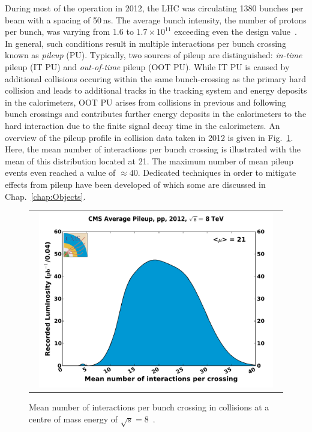 During most of the operation in 2012, the LHC was circulating 1380 bunches per beam with a spacing of 50\,ns. The average bunch intensity, \ie the number of protons per bunch, was varying from $1.6$ to $1.7 \times 10^{11}$ exceeding even the design value~\cite{bib:lhc:lumi12, Lamont:2013cma}. \\
In general, such conditions result in multiple interactions per bunch crossing known as \textit{pileup} (PU). Typically, two sources of pileup are distinguished: \textit{in-time} pileup (IT PU) and \textit{out-of-time} pileup (OOT PU). While IT PU is caused by additional \pp collisions occuring within the same bunch-crossing as the primary hard collision and leads to additional tracks in the tracking system and energy deposits in the calorimeters, OOT PU arises from \pp collisions in previous and following bunch crossings and contributes further energy deposits in the calorimeters to the hard interaction due to the finite signal decay time in the calorimeters. An overview of the pileup profile in collision data taken in 2012 is given in Fig.~\ref{fig:lhc_pileup}. Here, the mean number of interactions per bunch crossing is illustrated with the mean of this distribution located at 21. The maximum number of mean pileup events even reached a value of $\approx 40$. Dedicated techniques in order to mitigate effects from pileup have been developed of which some are discussed in Chap.~\ref{chap:Objects}.
\begin{figure}[!t]
  \centering
  \begin{tabular}{c}
    \includegraphics[width=0.95\textwidth]{figures/pileup_pp_2012.pdf} 
  \end{tabular}
  \caption{Mean number of interactions per bunch crossing in \pp collisions at a centre of mass energy of $\sqrt{s} = 8$\tev~\cite{bib:lhc:lumi12}.}
  \label{fig:lhc_pileup}
\end{figure}





